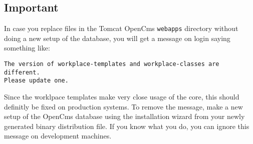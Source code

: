 \subsection{Important}

In case you replace files in the Tomcat OpenCms \texttt{webapps} directory without doing a new setup of the database, you will get a message on login saying something like: 

\texttt{The version of workplace-templates and workplace-classes are different.\\Please update one.}

Since the worklpace templates make very close usage of the core, this should 
definitly be fixed on production systems. To remove the message, make a new 
setup of the OpenCms database using the installation wizard from your newly 
generated binary distribution file. If you know what you do, you can ignore 
this message on development machines. 
